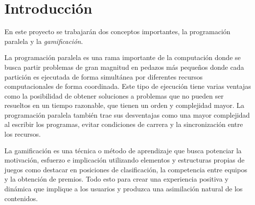 \documentclass[11pt,spanish,listoffigures,listoftables]{tfgetsinf}
\begin{document}
\begin{abstract}[english]

This work addresses the implementation of a website for parallel programming contests, with the addition of gamification, a learning technique that seeks to reward the user and increase their motivation by adding elements and dynamics typical of games to offer an enriching and positive experience. \par

This is a complex task, on the one hand, bringing the process of sending code to a web environment and the interaction it will have with the DSIC cluster \ kahan. And on the other, to transform the laboratory activities of the CPA and LPP subjects with new mechanics that encourage the student to seek to improve their results even after reaching a correct resolution of the proposed exercises. \par

This project has been carried out with the support of the UPV DSIC  in order to complement other tools used today in teaching. \par

\end{abstract}

\mainmatter

\chapter{Introducción}

En este proyecto se trabajarán dos conceptos importantes, la programación paralela y la \textit{gamificación}. \par

La programación paralela es una rama importante de la computación donde se busca partir problemas de gran magnitud en pedazos más pequeños donde cada partición es ejecutada de forma simultánea por diferentes recursos computacionales de forma coordinada. Este tipo de ejecución tiene varias ventajas como la posibilidad de obtener soluciones a problemas que no pueden ser resueltos en un tiempo razonable, que tienen un orden y complejidad mayor. La programación paralela también trae sus desventajas como una mayor complejidad al escribir los programas, evitar condiciones de carrera y la sincronización entre los recursos. \par

La gamificación es una técnica o método de aprendizaje que busca potenciar la motivación, esfuerzo e implicación utilizando elementos y estructuras propias de juegos como destacar en posiciones de clasificación, la competencia entre equipos y la obtención de premios. Todo esto para crear una experiencia positiva y dinámica que implique a los usuarios y produzca una asimilación natural de los contenidos. \par
\end{document}
